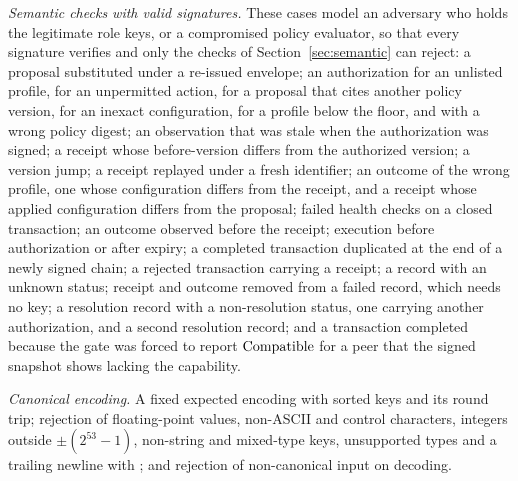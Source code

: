 \emph{Semantic checks with valid signatures.} These cases model an adversary who holds the legitimate role keys, or a compromised policy evaluator, so that every signature verifies and only the checks of Section~\ref{sec:semantic} can reject: a proposal substituted under a re-issued envelope; an authorization for an unlisted profile, for an unpermitted action, for a proposal that cites another policy version, for an inexact configuration, for a profile below the floor, and with a wrong policy digest; an observation that was stale when the authorization was signed; a receipt whose before-version differs from the authorized version; a version jump; a receipt replayed under a fresh identifier; an outcome of the wrong profile, one whose configuration differs from the receipt, and a receipt whose applied configuration differs from the proposal; failed health checks on a closed transaction; an outcome observed before the receipt; execution before authorization or after expiry; a completed transaction duplicated at the end of a newly signed chain; a rejected transaction carrying a receipt; a record with an unknown status; receipt and outcome removed from a failed record, which needs no key; a resolution record with a non-resolution status, one carrying another authorization, and a second resolution record; and a transaction completed because the gate was forced to report $\mathrm{Compatible}$ for a peer that the signed snapshot shows lacking the capability.

\emph{Canonical encoding.} A fixed expected encoding with sorted keys and its round trip; rejection of floating-point values, non-ASCII and control characters, integers outside $\pm(2^{53}-1)$, non-string and mixed-type keys, unsupported types and a trailing newline with ; and rejection of non-canonical input on decoding.

